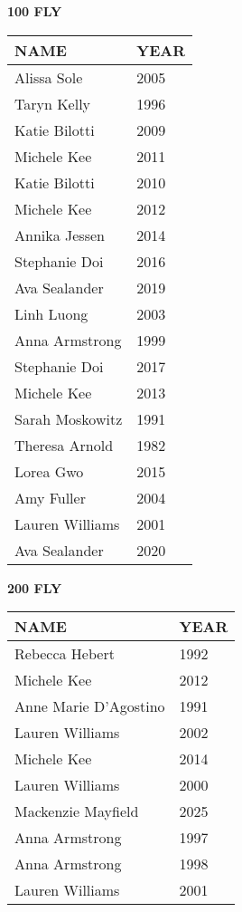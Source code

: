 \vspace{0.4cm}

\begin{minipage}[t]{0.48\textwidth}
\centering
\textbf{100 FLY}\\[0.05cm]
\begin{tabular}{@{}p{2.8cm}p{1.2cm}@{}}
\hline
\textbf{NAME} & \textbf{YEAR} \\
\hline
Alissa Sole & 2005 \\
Taryn Kelly & 1996 \\
Katie Bilotti & 2009 \\
Michele Kee & 2011 \\
Katie Bilotti & 2010 \\
Michele Kee & 2012 \\
Annika Jessen & 2014 \\
Stephanie Doi & 2016 \\
Ava Sealander & 2019 \\
Linh Luong & 2003 \\
Anna Armstrong & 1999 \\
Stephanie Doi & 2017 \\
Michele Kee & 2013 \\
Sarah Moskowitz & 1991 \\
Theresa Arnold & 1982 \\
Lorea Gwo & 2015 \\
Amy Fuller & 2004 \\
Lauren Williams & 2001 \\
Ava Sealander & 2020 \\
\hline
\end{tabular}
\end{minipage}\hfill
\begin{minipage}[t]{0.48\textwidth}
\centering
\textbf{200 FLY}\\[0.05cm]
\begin{tabular}{@{}p{2.8cm}p{1.2cm}@{}}
\hline
\textbf{NAME} & \textbf{YEAR} \\
\hline
Rebecca Hebert & 1992 \\
Michele Kee & 2012 \\
Anne Marie D'Agostino & 1991 \\
Lauren Williams & 2002 \\
Michele Kee & 2014 \\
Lauren Williams & 2000 \\
Mackenzie Mayfield & 2025 \\
Anna Armstrong & 1997 \\
Anna Armstrong & 1998 \\
Lauren Williams & 2001 \\
\hline
\end{tabular}
\end{minipage}

